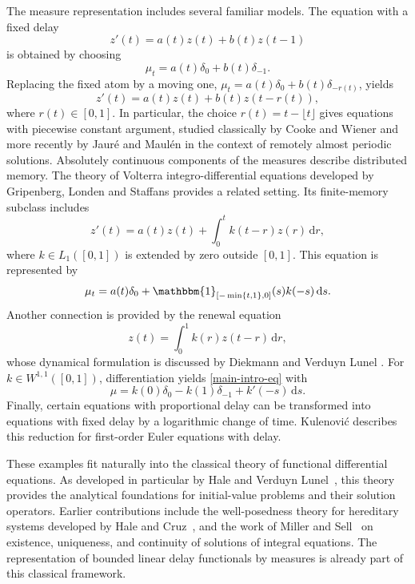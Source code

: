 \documentclass[reqno]{amsart}
\theoremstyle{plain}
\numberwithin{equation}{section}
\numberwithin{definition}{section}
\newcommand{\dd}{\ensuremath{\mathrm{d}}}
\begin{document}
The measure representation includes several familiar models.
The equation with a fixed delay
\begin{equation*}
z'(t)=a(t)z(t)+b(t)z(t-1)
\end{equation*}
is obtained by choosing
\begin{equation*}
\mu_t=a(t)\delta_0+b(t)\delta_{-1}.
\end{equation*}
Replacing the fixed atom by a moving one,
$\mu_t=a(t)\delta_0+b(t)\delta_{-r(t)}$, yields
\begin{equation*}
z'(t)=a(t)z(t)+b(t)z(t-r(t)),
\end{equation*}
where $r(t)\in[0,1]$. In particular, the choice
$r(t)=t-\lfloor t\rfloor$ gives equations with piecewise constant
argument, studied classically by Cooke and Wiener
\cite{CookeWiener1984} and more recently by Jaur\'e and Maul\'en
\cite{JaureMaulen2026} in the context of remotely almost periodic
solutions. Absolutely continuous components of the measures describe
distributed memory. The theory of Volterra integro-differential
equations developed by Gripenberg, Londen and Staffans
\cite{GripenbergLondenStaffans1990} provides a related setting.
Its finite-memory subclass includes
\begin{equation*}
z'(t)=a(t)z(t)+\int_0^t k(t-r)z(r)\,\dd r,
\end{equation*}
where $k\in L_1([0,1])$ is extended by zero outside $[0,1]$.
This equation is represented by
\begin{equation*}
\mu_t
=
a(t)\delta_0+
\mathbbm{1}_{[-\min\{t,1\},0]}(s)k(-s)\,\dd s.
\end{equation*}
Another connection is provided by the renewal equation
\begin{equation*}
z(t)=\int_0^1 k(r)z(t-r)\,\dd r,
\end{equation*}
whose dynamical formulation is discussed by Diekmann and
Verduyn Lunel \cite[Section~7]{DiekmannVerduynLunel2021}.
For $k\in W^{1,1}([0,1])$, differentiation yields
\eqref{main-intro-eq} with
\begin{equation*}
\mu=k(0)\delta_0-k(1)\delta_{-1}+k'(-s)\,\dd s.
\end{equation*}
Finally, certain equations with proportional delay can be transformed
into equations with fixed delay by a logarithmic change of time.
Kulenovi\'c \cite[Remark~2]{Kulenovic1995} describes this reduction
for first-order Euler equations with delay.

These examples fit naturally into the classical theory of
functional differential equations. As developed in particular
by Hale and Verduyn Lunel~\cite{Hale-Le}, this theory provides
the analytical foundations for initial-value problems and their
solution operators. Earlier contributions include the
well-posedness theory for hereditary systems developed by
Hale and Cruz~\cite{HaleCruz1970}, and the work of Miller and
Sell~\cite{MillerSell1968,MillerSell1970} on existence,
uniqueness, and continuity of solutions of integral equations.
The representation of bounded linear delay functionals by
measures is already part of this classical framework.
\end{document}
